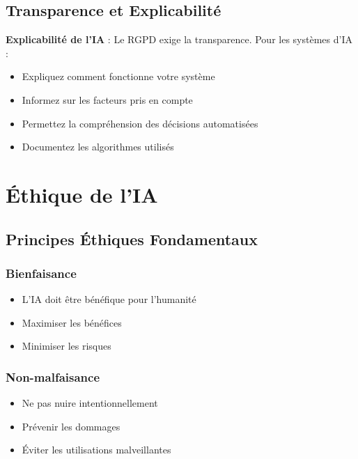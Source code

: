 \documentclass[11pt,a4paper]{article}
\begin{document}
\subsection{Transparence et Explicabilité}

\begin{importantbox}
\textbf{Explicabilité de l'IA} : Le RGPD exige la transparence. Pour les systèmes d'IA :
\begin{itemize}
    \item Expliquez comment fonctionne votre système
    \item Informez sur les facteurs pris en compte
    \item Permettez la compréhension des décisions automatisées
    \item Documentez les algorithmes utilisés
\end{itemize}
\end{importantbox}

\section{Éthique de l'IA}

\subsection{Principes Éthiques Fondamentaux}

\subsubsection{Bienfaisance}
\begin{itemize}
    \item L'IA doit être bénéfique pour l'humanité
    \item Maximiser les bénéfices
    \item Minimiser les risques
\end{itemize}

\subsubsection{Non-malfaisance}
\begin{itemize}
    \item Ne pas nuire intentionnellement
    \item Prévenir les dommages
    \item Éviter les utilisations malveillantes
\end{itemize}
\end{document}
